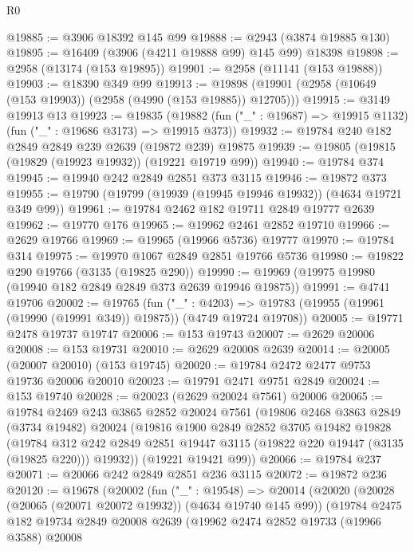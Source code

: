 \begin{lexlean}{R0}
\begin{coremodule}
@19885 := @3906 @18392 @145 @99
@19888 := @2943 (@3874 @19885 @130)
@19895 := @16409 (@3906 (@4211 @19888 @99) @145 @99) @18398
@19898 := @2958 (@13174 (@153 @19895))
@19901 := @2958 (@11141 (@153 @19888))
@19903 := @18390 @349 @99
@19913 := @19898 (@19901 (@2958 (@10649 (@153 @19903)) (@2958 (@4990 (@153 @19885)) @12705)))
@19915 := @3149 @19913 @13
@19923 := @19835
    (@19882 (fun ("_" : @19687) => @19915 @1132) (fun ("_" : @19686 @3173) => @19915 @373))
@19932 := @19784 @240 @182 @2849 @2849 @239 @2639 (@19872 @239) @19875
@19939 := @19805 (@19815 (@19829 (@19923 @19932)) (@19221 @19719 @99))
@19940 := @19784 @374
@19945 := @19940 @242 @2849 @2851 @373 @3115
@19946 := @19872 @373
@19955 := @19790 (@19799 (@19939 (@19945 @19946 @19932)) (@4634 @19721 @349 @99))
@19961 := @19784 @2462 @182 @19711 @2849 @19777 @2639
@19962 := @19770 @176
@19965 := @19962 @2461 @2852 @19710
@19966 := @2629 @19766
@19969 := @19965 (@19966 @5736) @19777
@19970 := @19784 @314
@19975 := @19970 @1067 @2849 @2851 @19766 @5736
@19980 := @19822 @290 @19766 (@3135 (@19825 @290))
@19990 := @19969 (@19975 @19980 (@19940 @182 @2849 @2849 @373 @2639 @19946 @19875))
@19991 := @4741 @19706
@20002 := @19765
    (fun ("_" : @4203) =>
    @19783 (@19955 (@19961 (@19990 (@19991 @349)) @19875)) (@4749 @19724 @19708))
@20005 := @19771 @2478 @19737 @19747
@20006 := @153 @19743
@20007 := @2629 @20006
@20008 := @153 @19731
@20010 := @2629 @20008 @2639
@20014 := @20005 (@20007 @20010) (@153 @19745)
@20020 := @19784 @2472 @2477 @9753 @19736 @20006 @20010
@20023 := @19791 @2471 @9751 @2849
@20024 := @153 @19740
@20028 := @20023 (@2629 @20024 @7561) @20006
@20065 := @19784
    @2469
    @243
    @3865
    @2852
    @20024
    @7561
    (@19806
      @2468
      @3863
      @2849
      (@3734 @19482)
      @20024
      (@19816
        @1900
        @2849
        @2852
        @3705
        @19482
        @19828
        (@19784
          @312
          @242
          @2849
          @2851
          @19447
          @3115
          (@19822 @220 @19447 (@3135 (@19825 @220)))
          @19932))
      (@19221 @19421 @99))
@20066 := @19784 @237
@20071 := @20066 @242 @2849 @2851 @236 @3115
@20072 := @19872 @236
@20120 := @19678
    (@20002
      (fun ("_" : @19548) =>
      @20014
        (@20020
          (@20028 (@20065 (@20071 @20072 @19932)) (@4634 @19740 @145 @99))
          (@19784
            @2475
            @182
            @19734
            @2849
            @20008
            @2639
            (@19962
              @2474
              @2852
              @19733
              (@19966 @3588)
              @20008

\end{coremodule}
\end{lexlean}
